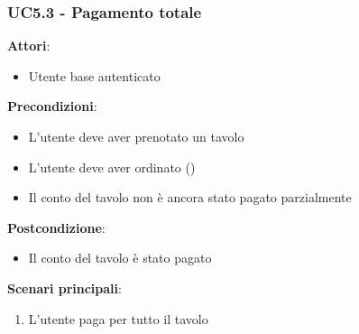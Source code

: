 \subsubsection{UC5.3 - Pagamento totale}\label{usecase:5.3}
\textbf{Attori}:
\begin{itemize}
    \item Utente base autenticato
\end{itemize}
\textbf{Precondizioni}:
\begin{itemize}
    \item L'utente deve aver prenotato un tavolo
    \item L'utente deve aver ordinato ()
    \item Il conto del tavolo non è ancora stato pagato parzialmente
\end{itemize}
\textbf{Postcondizione}:
\begin{itemize}
    \item Il conto del tavolo è stato pagato
\end{itemize}
\textbf{Scenari principali}:
\begin{enumerate}
    \item L'utente paga per tutto il tavolo
\end{enumerate}